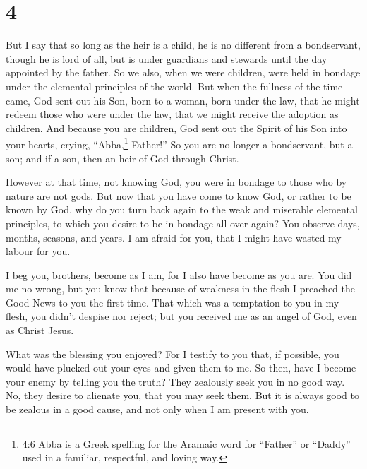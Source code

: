\hypertarget{section-3}{%
\section{4}\label{section-3}}

 But I say that so long as the heir is a child, he is no
different from a bondservant, though he is lord of all,  but
is under guardians and stewards until the day appointed by the father.
 So we also, when we were children, were held in bondage
under the elemental principles of the world.  But when the
fullness of the time came, God sent out his Son, born to a woman, born
under the law,  that he might redeem those who were under
the law, that we might receive the adoption as children. 
And because you are children, God sent out the Spirit of his Son into
your hearts, crying, ``Abba,\footnote{4:6 Abba is a Greek spelling for
  the Aramaic word for ``Father'' or ``Daddy'' used in a familiar,
  respectful, and loving way.} Father!''  So you are no
longer a bondservant, but a son; and if a son, then an heir of God
through Christ.

 However at that time, not knowing God, you were in bondage
to those who by nature are not gods.  But now that you have
come to know God, or rather to be known by God, why do you turn back
again to the weak and miserable elemental principles, to which you
desire to be in bondage all over again?  You observe days,
months, seasons, and years.  I am afraid for you, that I
might have wasted my labour for you.

 I beg you, brothers, become as I am, for I also have
become as you are. You did me no wrong,  but you know that
because of weakness in the flesh I preached the Good News to you the
first time.  That which was a temptation to you in my
flesh, you didn't despise nor reject; but you received me as an angel of
God, even as Christ Jesus.

 What was the blessing you enjoyed? For I testify to you
that, if possible, you would have plucked out your eyes and given them
to me.  So then, have I become your enemy by telling you
the truth?  They zealously seek you in no good way. No,
they desire to alienate you, that you may seek them.  But
it is always good to be zealous in a good cause, and not only when I am
present with you.

